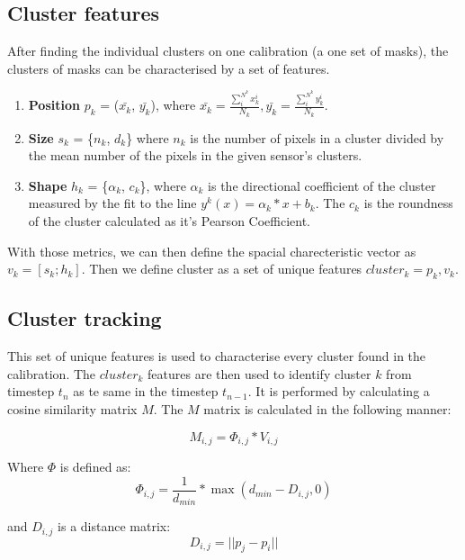 \subsection{Cluster features}

After finding the individual clusters on one calibration (a one set of masks), the clusters of masks can be characterised by a set of features.
\begin{enumerate}
\item \textbf{Position}  {$p_k$ = ($\bar{x_k}$, $\bar{y_k}$}), where $\bar{x_k} = \frac{\sum_{i}^{N^k}x_k^i}{N_k},
    \bar{y_k} = \frac{\sum_{i}^{N^k}y_k^i}{N_k}$.
\item \textbf{Size} $s_k$ = \{$n_k$, $d_k$\} where $n_k$ is the number of pixels in a cluster divided by the mean number of the pixels in the given sensor's clusters.
\item \textbf{Shape} $h_k$ = \{$\alpha_k$, $c_k$\}, where $\alpha_k$ is the directional coefficient of the cluster measured by the fit to the line $y^k(x) = \alpha_k*x + b_k$. The $c_k$ is the roundness of the cluster calculated as it's Pearson Coefficient.
\end{enumerate}
With those metrics, we can then define the spacial charecteristic vector as $v_k = [s_k; h_k]$. Then we define cluster as a set of unique features $cluster_k = {p_k, v_k}$.

\subsection{Cluster tracking}

This set of unique features is used to characterise every cluster found in the calibration.
The $cluster_{k}$ features are then used to identify cluster $k$ from timestep $t_{n}$ as te same in the timestep $t_{n-1}$.
It is performed by calculating a cosine similarity matrix $M$. The $M$ matrix is calculated in the following manner:

\begin{equation}
    M_{i,j} = \Phi_{i,j} * V_{i,j}
\end{equation}

Where $\Phi$ is defined as:
\begin{equation}
    \Phi_{i,j} = \frac{1}{d_{min}}*\max(d_{min} - D_{i,j}, 0)
\end{equation}

and $ D_{i,j} $ is a distance matrix:
 \begin{equation}D_{i,j} = || p_j - p_i ||\end{equation}

